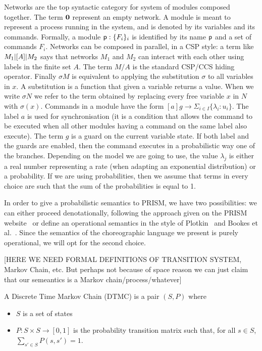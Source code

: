 Networks are the top syntactic category for system of modules composed
together. The term $\mathbf{0}$ represent an empty network. A module is
meant to represent a process running in the system, and is denoted by
its variables and its commands. Formally, a module
$\textsf{p}:\{F_i\}_i$ is identified by its name $\textsf{p}$ and a set of
commands $F_i$. Networks can be composed in parallel, in a CSP style:
a term like $M_1 |[A]| M_2$ says that networks $M_1$ and $M_2$ can
interact with each other using labels in the finite set $A$. The term
$M/A$ is the standard CSP/CCS hiding operator. Finally $\sigma M$ is
equivalent to applying the substitution $\sigma$ to all variables in
$x$. A substitution is a function that given a variable returns a
value. When we write $\sigma N$ we refer to the term obtained by
replacing every free variable $x$ in $N$ with $\sigma(x)$.   Commands in a module have the form
$[a] g \rightarrow \Sigma_{i\in I}\{\lambda_i: u_i\}$. The label $a$
is used for synchronisation (it is a condition that allows the command
to be executed when all other modules having a command on the same
label also execute).  The term $g$ is a guard on the current variable
state. If both label and the guards are enabled, then the command
executes in a probabilistic way one of the branches.  Depending on the
model we are going to use, the value $\lambda_j$ is either a real
number representing a rate (when adapting an exponential distribution)
or a probability. If we are using probabilities, then we assume that
terms in every choice are such that the sum of the probabilities is
equal to 1.

 In order to give a probabilistic semantics to
PRISM, we have two possibilities: we can either proceed
denotationally, following the approach given on the PRISM
website~\cite{prismemantics} or define an operational semantics in the
style of Plotkin~\cite{P80} and Bookes et al.~\cite{BRW86}. Since the
semantics of the choreographic language we present is purely
operational, we will opt for the second choice.

[HERE WE NEED FORMAL DEFINITIONS OF TRANSITION SYSTEM, Markov Chain,
etc. But perhaps not because of space reason we can just claim that
our semeantics is a Markov chain/process/whatever]
\begin{definition}
  A Discrete Time Markov Chain (DTMC) is a pair $(S,P)$ where
  \begin{itemize}
  \item $S$ is a set of states
  \item $P: S\times S \rightarrow [0,1]$ is the probability transition
    matrix such that, for all $s\in S$, $\sum_{s'\in S}P(s,s')=1$.
  \end{itemize}
\end{definition}

